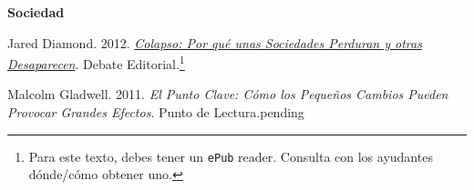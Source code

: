 \documentclass[letterpaper]{article}
\renewenvironment{itemize}{
  \begin{list}{}{
    \setlength{\leftmargin}{1.5em}
  }
}{
  \end{list}
}
\begin{document}
\begin{enumerate}
\item {\bf Sociedad}

      \begin{itemize}
        \item[$\bullet$] Jared Diamond. 2012. \href{https://github.com/hbahamonde/Intro_Ciencias_Sociales/raw/master/Readings/Diamond_Colapso_sociedades_perduran_desaparecen.epub}{\emph{Colapso: Por qu\'e unas Sociedades Perduran y otras Desaparecen}}. Debate Editorial.\footnote{Para este texto, debes tener un {\color{blue}\texttt{ePub}} reader. Consulta con los ayudantes d\'onde/c\'omo obtener uno.}
        \item[$\bullet$] Malcolm Gladwell. 2011. \emph{El Punto Clave: C\'omo los Peque\~nos Cambios Pueden Provocar Grandes Efectos}. Punto de Lectura.{\color{red}pending}
      \end{itemize}


\end{enumerate}








 








\newpage
{}
\setcounter{page}{1}
\printbibliography
\end{document}
